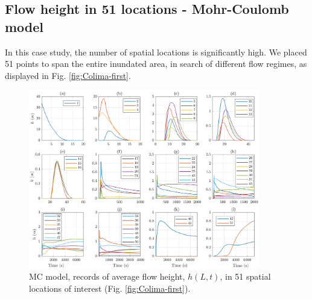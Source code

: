 \documentclass{article}
\begin{document}
\subsection{Flow height in 51 locations - Mohr-Coulomb model}
In this case study, the number of spatial locations is significantly high. We placed 51 points to span the entire inundated area, in search of different flow regimes, as displayed in Fig. \ref{fig:Colima-first}. 
\begin{figure}[H]
         \centering
        \includegraphics[width=0.9\textwidth]{MC&VS_51/Height_MC2.png}
        \caption{MC model, records of average flow height, $h(L,t)$, in 51 spatial locations of interest (Fig. \ref{fig:Colima-first}).}
        \label{fig:BAF-H-MC}
\end{figure}
\end{document}
